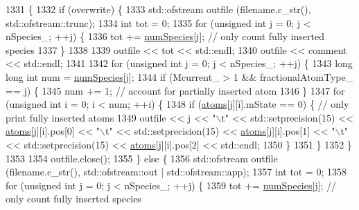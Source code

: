 \begin{DoxyCode}
1331                                                                                     \{
1332     \textcolor{keywordflow}{if} (overwrite) \{
1333         std::ofstream outfile (filename.c\_str(), std::ofstream::trunc);
1334         \textcolor{keywordtype}{int} tot = 0;
1335         \textcolor{keywordflow}{for} (\textcolor{keywordtype}{unsigned} \textcolor{keywordtype}{int} j = 0; j < nSpecies\_; ++j) \{
1336             tot += \hyperlink{classsim_system_a9eea865e6dc1cff377b1e79c4d9c23f0}{numSpecies}[j]; \textcolor{comment}{// only count fully inserted species}
1337         \}
1338 
1339         outfile << tot << std::endl;
1340         outfile << comment << std::endl;
1341 
1342         \textcolor{keywordflow}{for} (\textcolor{keywordtype}{unsigned} \textcolor{keywordtype}{int} j = 0; j < nSpecies\_; ++j) \{
1343             \textcolor{keywordtype}{long} \textcolor{keywordtype}{long} \textcolor{keywordtype}{int} num = \hyperlink{classsim_system_a9eea865e6dc1cff377b1e79c4d9c23f0}{numSpecies}[j];
1344             \textcolor{keywordflow}{if} (Mcurrent\_ > 1 && fractionalAtomType\_ == j) \{
1345                 num += 1; \textcolor{comment}{// account for partially inserted atom}
1346             \}
1347             \textcolor{keywordflow}{for} (\textcolor{keywordtype}{unsigned} \textcolor{keywordtype}{int} i = 0; i < num; ++i) \{
1348                 \textcolor{keywordflow}{if} (\hyperlink{classsim_system_a90421b19082f7fb8fc23b7264b1161e4}{atoms}[j][i].mState == 0) \{ \textcolor{comment}{// only print fully inserted atoms}
1349                     outfile << j << \textcolor{stringliteral}{"\(\backslash\)t"} <<  std::setprecision(15) << \hyperlink{classsim_system_a90421b19082f7fb8fc23b7264b1161e4}{atoms}[j][i].pos[0] << \textcolor{stringliteral}{"\(\backslash\)t"} << 
      std::setprecision(15) << \hyperlink{classsim_system_a90421b19082f7fb8fc23b7264b1161e4}{atoms}[j][i].pos[1] << \textcolor{stringliteral}{"\(\backslash\)t"} << std::setprecision(15) << 
      \hyperlink{classsim_system_a90421b19082f7fb8fc23b7264b1161e4}{atoms}[j][i].pos[2] << std::endl;
1350                 \}
1351             \}
1352         \}
1353 
1354         outfile.close();
1355     \} \textcolor{keywordflow}{else} \{
1356         std::ofstream outfile (filename.c\_str(), std::ofstream::out | std::ofstream::app);
1357         \textcolor{keywordtype}{int} tot = 0;
1358         \textcolor{keywordflow}{for} (\textcolor{keywordtype}{unsigned} \textcolor{keywordtype}{int} j = 0; j < nSpecies\_; ++j) \{
1359             tot += \hyperlink{classsim_system_a9eea865e6dc1cff377b1e79c4d9c23f0}{numSpecies}[j]; \textcolor{comment}{// only count fully inserted species}

\end{DoxyCode}
